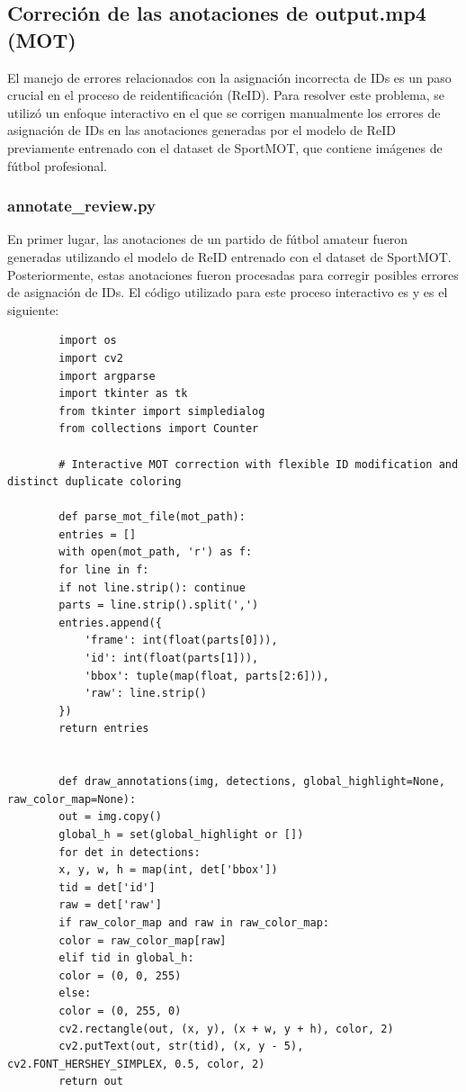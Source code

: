 \documentclass[12pt, a4paper, twoside]{article}
\begin{document}
	\subsection{Correción de las anotaciones de output.mp4 (MOT)}
	
	El manejo de errores relacionados con la asignación incorrecta de IDs es un paso crucial en el proceso de reidentificación (ReID). Para resolver este problema, se utilizó un enfoque interactivo en el que se corrigen manualmente los errores de asignación de IDs en las anotaciones generadas por el modelo de ReID previamente entrenado con el dataset de SportMOT, que contiene imágenes de fútbol profesional.
	
	\subsubsection{annotate\_review.py}
	
	En primer lugar, las anotaciones de un partido de fútbol amateur fueron generadas utilizando el modelo de ReID entrenado con el dataset de SportMOT. Posteriormente, estas anotaciones fueron procesadas para corregir posibles errores de asignación de IDs. El código utilizado para este proceso interactivo es  y es el siguiente:
	
	\begin{verbatim}
		import os
		import cv2
		import argparse
		import tkinter as tk
		from tkinter import simpledialog
		from collections import Counter
		
		# Interactive MOT correction with flexible ID modification and distinct duplicate coloring
		
		def parse_mot_file(mot_path):
		entries = []
		with open(mot_path, 'r') as f:
		for line in f:
		if not line.strip(): continue
		parts = line.strip().split(',')
		entries.append({
			'frame': int(float(parts[0])), 
			'id': int(float(parts[1])), 
			'bbox': tuple(map(float, parts[2:6])),
			'raw': line.strip()
		})
		return entries
		
		
		def draw_annotations(img, detections, global_highlight=None, raw_color_map=None):
		out = img.copy()
		global_h = set(global_highlight or [])
		for det in detections:
		x, y, w, h = map(int, det['bbox'])
		tid = det['id']
		raw = det['raw']
		if raw_color_map and raw in raw_color_map:
		color = raw_color_map[raw]
		elif tid in global_h:
		color = (0, 0, 255)
		else:
		color = (0, 255, 0)
		cv2.rectangle(out, (x, y), (x + w, y + h), color, 2)
		cv2.putText(out, str(tid), (x, y - 5), cv2.FONT_HERSHEY_SIMPLEX, 0.5, color, 2)
		return out
	\end{verbatim}
	
\end{document}
